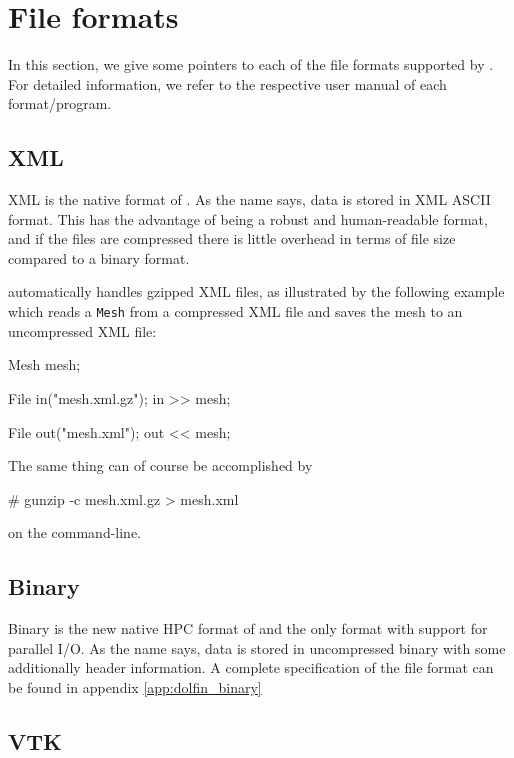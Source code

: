 \section{File formats}

In this section, we give some pointers to each of the file formats
supported by \dolfin{}. For detailed information, we refer to the
respective user manual of each format/program.


\subsection{\dolfin{} XML}

\dolfin{} XML is the native format of \dolfin{}. As the name says,
data is stored in XML ASCII format. This has the advantage of being a
robust and human-readable format, and if the files are compressed
there is little overhead in terms of file size compared to a binary
format.

\dolfin{} automatically handles gzipped XML files, as
illustrated by the following example which reads a \texttt{Mesh} from
a compressed \dolfin{} XML file and saves the mesh to an uncompressed
\dolfin{} XML file:
\begin{code}
Mesh mesh;

File in("mesh.xml.gz");
in >> mesh;

File out("mesh.xml");
out << mesh;
\end{code}
The same thing can of course be accomplished by
\begin{code}
# gunzip -c mesh.xml.gz > mesh.xml
\end{code}
on the command-line.

\subsection{\dolfin{} Binary}

\dolfin{} Binary is the new native HPC format of \dolfin{} and the
only format with support for parallel I/O. As the name says, data is
stored in uncompressed binary with some additionally header
information. A complete specification of the file format can be found
in appendix \ref{app:dolfin_binary}

\subsection{VTK}

